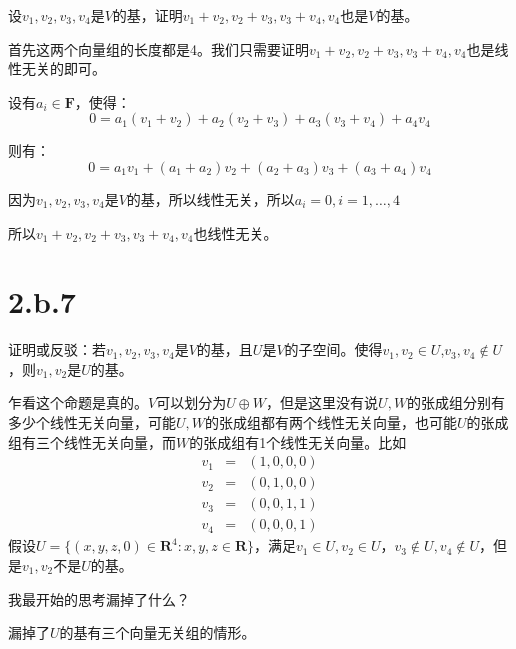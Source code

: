 \documentclass[10pt,a4paper,UTF8]{article}
\begin{document}
\begin{problem}
设\(v_{1},v_{2},v_{3},v_{4}\)是\(V\)的基，证明\(v_{1}+v_{2},v_{2}+v_{3},v_{3}+v_{4},v_{4}\)也是\(V\)的基。
\end{problem}

\begin{answer}
首先这两个向量组的长度都是4。我们只需要证明\(v_{1}+v_{2},v_{2}+v_{3},v_{3}+v_{4},v_{4}\)也是线性无关的即可。

设有\(a_{i}\in \mathbf{F}\)，使得：
\begin{equation}
\label{eq:3}
0= a_{1}(v_{1} +v_{2}) + a_{2}(v_{2} + v_{3}) + a_{3}(v_{3}+v_{4}) + a_{4}v_{4}
\end{equation}

则有：
\begin{equation}
\label{eq:4}
0 = a_{1}v_{1} + (a_{1}+a_{2})v_{2} + (a_{2}+a_{3})v_{3} + (a_{3} + a_{4})v_{4}
\end{equation}

因为\(v_{1},v_{2},v_{3},v_{4}\)是\(V\)的基，所以线性无关，所以\(a_{i}=0,i=1,\ldots ,4\)

所以\(v_{1}+v_{2},v_{2}+v_{3},v_{3}+v_{4},v_{4}\)也线性无关。
\end{answer}

\section*{2.b.7}
\label{sec:org2ab534f}


\begin{problem}
证明或反驳：若\(v_{1},v_{2},v_{3},v_{4}\)是\(V\)的基，且\(U\)是\(V\)的子空间。使得\(v_{1},v_{2}\in U\),\(v_{3},v_{4}\notin U\)，则\(v_{1},v_{2}\)是\(U\)的基。
\end{problem}

\begin{answer}
乍看这个命题是真的。\(V\)可以划分为\(U\oplus W\)，但是这里没有说\(U,W\)的张成组分别有多少个线性无关向量，可能\(U,W\)的张成组都有两个线性无关向量，也可能\(U\)的张成组有三个线性无关向量，而\(W\)的张成组有1个线性无关向量。比如
\begin{eqnarray*}
v_{1}&=&(1,0,0,0) \\
v_{2}&=&(0,1,0,0) \\
v_{3}&=&(0,0,1,1) \\
v_{4}&=&(0,0,0,1) 
\end{eqnarray*}
假设\(U=\{(x,y,z,0)\in \mathbf{R}^{4}:x,y,z\in \mathbf{R}\}\)，满足\(v_{1}\in U,v_{2}\in U\)，\(v_{3}\notin U,v_{4}\notin U\)，但是\(v_{1},v_{2}\)不是\(U\)的基。

我最开始的思考漏掉了什么？

漏掉了\(U\)的基有三个向量无关组的情形。
\end{answer}
\end{document}
